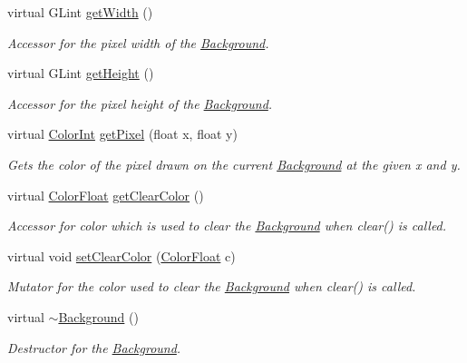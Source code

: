 \begin{DoxyCompactItemize}
virtual G\+Lint \hyperlink{classtsgl_1_1_background_a7db981b1f06b6294200b115bf47846ec}{get\+Width} ()
\begin{DoxyCompactList}\small\item\em Accessor for the pixel width of the \hyperlink{classtsgl_1_1_background}{Background}. \end{DoxyCompactList}\item 
virtual G\+Lint \hyperlink{classtsgl_1_1_background_aa6482a67b1feebc42989767823d87c07}{get\+Height} ()
\begin{DoxyCompactList}\small\item\em Accessor for the pixel height of the \hyperlink{classtsgl_1_1_background}{Background}. \end{DoxyCompactList}\item 
virtual \hyperlink{structtsgl_1_1_color_int}{Color\+Int} \hyperlink{classtsgl_1_1_background_a09d91731095fd0839eaf6e46c3d279b5}{get\+Pixel} (float x, float y)
\begin{DoxyCompactList}\small\item\em Gets the color of the pixel drawn on the current \hyperlink{classtsgl_1_1_background}{Background} at the given x and y. \end{DoxyCompactList}\item 
virtual \hyperlink{structtsgl_1_1_color_float}{Color\+Float} \hyperlink{classtsgl_1_1_background_a96a6fe572a3a2c16da71fe3fc13a24af}{get\+Clear\+Color} ()
\begin{DoxyCompactList}\small\item\em Accessor for color which is used to clear the \hyperlink{classtsgl_1_1_background}{Background} when clear() is called. \end{DoxyCompactList}\item 
virtual void \hyperlink{classtsgl_1_1_background_a19c0f2c72e7b16be4554118995d894fa}{set\+Clear\+Color} (\hyperlink{structtsgl_1_1_color_float}{Color\+Float} c)
\begin{DoxyCompactList}\small\item\em Mutator for the color used to clear the \hyperlink{classtsgl_1_1_background}{Background} when clear() is called. \end{DoxyCompactList}\item 
\mbox{\label{classtsgl_1_1_background_a17dc3a892b0e774550d42eb753b24c9c}} 
virtual \hyperlink{classtsgl_1_1_background_a17dc3a892b0e774550d42eb753b24c9c}{$\sim$\+Background} ()
\begin{DoxyCompactList}\small\item\em Destructor for the \hyperlink{classtsgl_1_1_background}{Background}. \end{DoxyCompactList}\end{DoxyCompactItemize}
